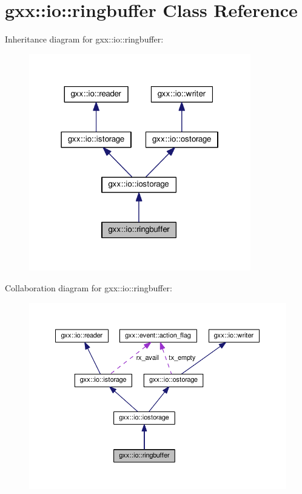 \hypertarget{classgxx_1_1io_1_1ringbuffer}{}\section{gxx\+:\+:io\+:\+:ringbuffer Class Reference}
\label{classgxx_1_1io_1_1ringbuffer}


Inheritance diagram for gxx\+:\+:io\+:\+:ringbuffer\+:
\nopagebreak
\begin{figure}[H]
\begin{center}
\leavevmode
\includegraphics[width=274pt]{classgxx_1_1io_1_1ringbuffer__inherit__graph}
\end{center}
\end{figure}


Collaboration diagram for gxx\+:\+:io\+:\+:ringbuffer\+:
\nopagebreak
\begin{figure}[H]
\begin{center}
\leavevmode
\includegraphics[width=350pt]{classgxx_1_1io_1_1ringbuffer__coll__graph}
\end{center}
\end{figure}
